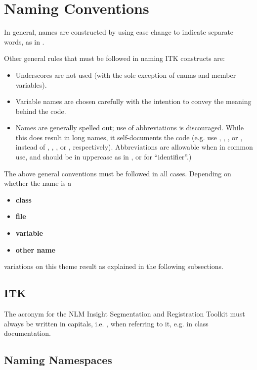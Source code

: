 \section{Naming Conventions}
\label{sec:NamingConventions}

In general, names are constructed by using case change to indicate separate
words, as in .

Other general rules that must be followed in naming ITK constructs are:
\begin{itemize}
\item Underscores are not used (with the sole exception of enums and member
variables).
\item Variable names are chosen carefully with the intention to convey the
meaning behind the code.
\item Names are generally spelled out; use of abbreviations is discouraged.
While this does result in long names, it self-documents the code (e.g. use
, , , or , instead of
, , , or , respectively). Abbreviations
are allowable when in common use, and should be in uppercase as in ,
or  for ``identifier''.)
\end{itemize}


The above general conventions must be followed in all cases. Depending on
whether the name is a
\begin{itemize}
\item \textbf{class}
\item \textbf{file}
\item \textbf{variable}
\item \textbf{other name}
\end{itemize}
variations on this theme result as explained in the following subsections.


\subsection{ITK}
\label{subsec:ITK}

The acronym for the NLM Insight Segmentation and Registration Toolkit must
always be written in capitals, i.e. , when referring to it, e.g. in
class documentation.


\subsection{Naming Namespaces}
\label{subsec:NamingNamespaces}


